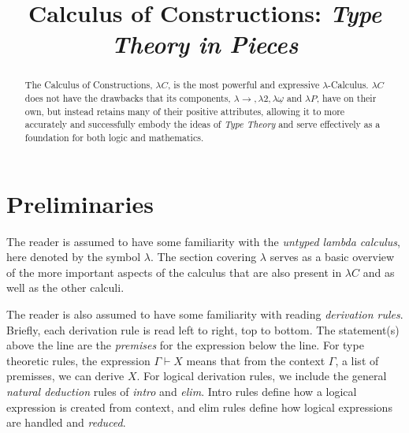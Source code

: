 \documentclass[9pt,preprint,nocopyrightspace,computermodern]{sigplanconf} %
\begin{document}


\setlength{\pdfpageheight}{\paperheight}
\setlength{\pdfpagewidth}{\paperwidth}
\setlength{\epigraphrule}{0pt}




\title{Calculus of Constructions: {\em Type Theory in Pieces}}

\maketitle

\begin{abstract}
  The Calculus of Constructions, \(\lambda C\), is the most powerful and expressive
  \(\lambda\)-Calculus. \(\lambda C\) does not have the drawbacks that its components,
  \(\lambda\!\!\rightarrow, \lambda2, \lambda\underline\omega\) and \(\lambda P\),
  have on their own, but instead retains many of their positive attributes, allowing
  it to more accurately and successfully embody the ideas of \textit{Type Theory} and
  serve effectively as a foundation for both logic and mathematics.
\end{abstract}

\section*{Preliminaries}
The reader is assumed to have some familiarity with the \textit{untyped lambda calculus},
here denoted by the symbol \textbf{\(\lambda\)}. The section covering \(\lambda\) serves
as a basic overview of the more important aspects of the calculus that are also present in
\(\lambda C\) and as well as the other calculi.

The reader is also assumed to have some familiarity with reading \textit{derivation rules}.
Briefly, each derivation rule is read left to right, top to bottom. The statement(s) above
the line are the \textit{premises} for the expression below the line. For type theoretic
rules, the expression \(\Gamma\vdash\! X\) means that from the context \(\Gamma\), a list
of premisses, we can derive \(X\). For logical derivation rules, we include the general
\textit{natural deduction} rules of \textit{intro} and \textit{elim}. Intro rules define
how a logical expression is created from context, and elim rules define how logical expressions
are handled and \textit{reduced}.
\end{document}
